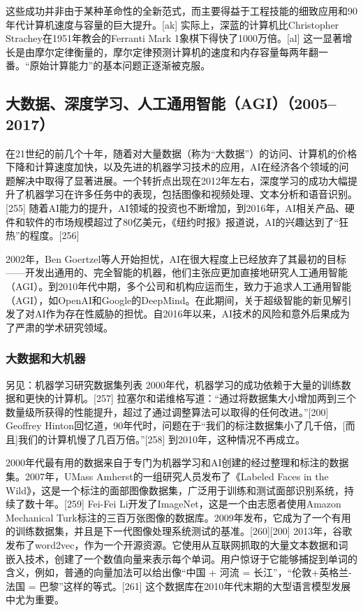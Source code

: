 这些成功并非由于某种革命性的全新范式，而主要得益于工程技能的细致应用和90年代计算机速度与容量的巨大提升。[ak] 实际上，深蓝的计算机比Christopher Strachey在1951年教会的Ferranti Mark 1象棋下得快了1000万倍。[al] 这一显著增长是由摩尔定律衡量的，摩尔定律预测计算机的速度和内存容量每两年翻一番。“原始计算能力”的基本问题正逐渐被克服。
\subsection{大数据、深度学习、人工通用智能（AGI）（2005–2017）}  
在21世纪的前几个十年，随着对大量数据（称为“大数据”）的访问、计算机的价格下降和计算速度加快，以及先进的机器学习技术的应用，AI在经济各个领域的问题解决中取得了显著进展。一个转折点出现在2012年左右，深度学习的成功大幅提升了机器学习在许多任务中的表现，包括图像和视频处理、文本分析和语音识别。[255] 随着AI能力的提升，AI领域的投资也不断增加，到2016年，AI相关产品、硬件和软件的市场规模超过了80亿美元，《纽约时报》报道说，AI的兴趣达到了“狂热”的程度。[256]

2002年，Ben Goertzel等人开始担忧，AI在很大程度上已经放弃了其最初的目标——开发出通用的、完全智能的机器，他们主张应更加直接地研究人工通用智能（AGI）。到2010年代中期，多个公司和机构应运而生，致力于追求人工通用智能（AGI），如OpenAI和Google的DeepMind。在此期间，关于超级智能的新见解引发了对AI作为存在性威胁的担忧。自2016年以来，AI技术的风险和意外后果成为了严肃的学术研究领域。
\subsubsection{大数据和大机器}  
另见：机器学习研究数据集列表  
2000年代，机器学习的成功依赖于大量的训练数据和更快的计算机。[257] 拉塞尔和诺维格写道：“通过将数据集大小增加两到三个数量级所获得的性能提升，超过了通过调整算法可以取得的任何改进。”[200] Geoffrey Hinton回忆道，90年代时，问题在于“我们的标注数据集小了几千倍，[而且]我们的计算机慢了几百万倍。”[258] 到2010年，这种情况不再成立。

2000年代最有用的数据来自于专门为机器学习和AI创建的经过整理和标注的数据集。2007年，UMass Amherst的一组研究人员发布了《Labeled Faces in the Wild》，这是一个标注的面部图像数据集，广泛用于训练和测试面部识别系统，持续了数十年。[259] Fei-Fei Li开发了ImageNet，这是一个由志愿者使用Amazon Mechanical Turk标注的三百万张图像的数据库。2009年发布，它成为了一个有用的训练数据集，并且是下一代图像处理系统测试的基准。[260][200] 2013年，谷歌发布了word2vec，作为一个开源资源。它使用从互联网抓取的大量文本数据和词嵌入技术，创建了一个数值向量来表示每个单词。用户惊讶于它能够捕捉到单词的含义，例如，普通的向量加法可以给出像“中国 + 河流 = 长江”，“伦敦+英格兰-法国 = 巴黎”这样的等式。[261] 这个数据库在2010年代末期的大型语言模型发展中尤为重要。

